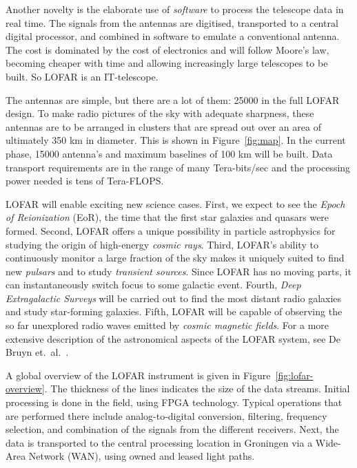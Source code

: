 \documentclass{article}
\begin{document}
Another novelty is the elaborate
use of \emph{software\/} to process the telescope data in real time.
The signals from the
antennas are digitised, transported to a central digital processor,
and combined in software to emulate a conventional antenna. The cost
is dominated by the cost of electronics and will follow Moore's law,
becoming cheaper with time and allowing increasingly large telescopes
to be built. So LOFAR is an IT-telescope. 

The antennas are simple, but there are a lot of them: 25000 in the full LOFAR
design. To make radio pictures of the sky with adequate sharpness,
these antennas are to be arranged in clusters that are spread out over
an area of ultimately 350 km in diameter. This is shown in Figure~\ref{fig:map}.
In the current phase, 15000 
antenna's and maximum baselines of 100 km will
be built. Data transport requirements are in the range of many
Tera-bits/sec and the processing power needed is tens of Tera-FLOPS.

LOFAR will enable exciting new science cases.  First, we expect to see
the \emph{Epoch of Reionization\/} (EoR), the time that the first star
galaxies and quasars were formed. Second, LOFAR offers a unique
possibility in particle astrophysics for studying the origin of
high-energy \emph{cosmic rays}.  Third, LOFAR's ability to
continuously monitor a large fraction of the sky makes it uniquely
suited to find new \emph{pulsars} and to study \emph{transient
  sources}.  Since LOFAR has no moving parts, it can instantaneously
switch focus to some galactic event.  Fourth, \emph{Deep Extragalactic
  Surveys\/} will be carried out to find the most distant radio
galaxies and study star-forming galaxies.  Fifth, LOFAR will be
capable of observing the so far unexplored radio waves emitted by
\emph{cosmic magnetic fields}.  For a more extensive description of
the astronomical aspects of the LOFAR system, see De Bruyn
et.~al.~\cite{Bruyn:02}.

A global overview of the LOFAR instrument is given in
Figure~\ref{fig:lofar-overview}. The thickness of the lines indicates
the size of the data streams.  Initial processing is done in the
field, using FPGA technology.  Typical operations that are performed
there include analog-to-digital conversion, filtering, frequency
selection, and combination of the signals from the different
receivers.  Next, the data is transported to the central processing
location in Groningen via a Wide-Area Network (WAN), using owned and
leased light paths.
\end{document}
